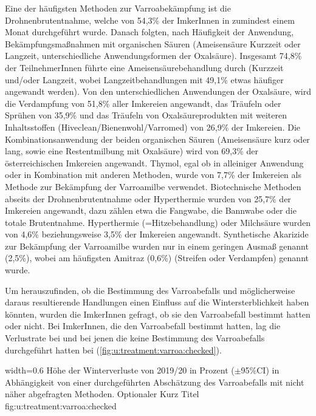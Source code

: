 Eine der häufigsten Methoden zur Varroabekämpfung ist die Drohnenbrutentnahme, welche von 54,3\% der ImkerInnen in zumindest einem Monat durchgeführt wurde. Danach folgten, nach Häufigkeit der Anwendung, Bekämpfungsmaßnahmen mit organischen Säuren (Ameisensäure Kurzzeit oder Langzeit, unterschiedliche Anwendungsformen der Oxalsäure). Insgesamt 74,8\% der TeilnehmerInnen führte eine Ameisensäurebehandlung durch (Kurzzeit und/oder Langzeit, wobei Langzeitbehandlungen mit 49,1\% etwas häufiger angewandt werden). Von den unterschiedlichen Anwendungen der Oxalsäure, wird die Verdampfung von 51,8\% aller Imkereien angewandt, das Träufeln oder Sprühen von 35,9\% und das Träufeln von Oxalsäureprodukten mit weiteren Inhaltsstoffen (Hiveclean/Bienenwohl/Varromed) von 26,9\% der Imkereien. Die Kombinationsanwendung der beiden organischen Säuren (Ameisensäure kurz oder lang, sowie eine Restentmilbung mit Oxalsäure) wird von 69,3\% der österreichischen Imkereien angewandt. Thymol, egal ob in alleiniger Anwendung oder in Kombination mit anderen Methoden, wurde von 7,7\% der Imkereien als Methode zur Bekämpfung der Varroamilbe verwendet. Biotechnische Methoden abseits der Drohnenbrutentnahme oder Hyperthermie wurden von 25,7\% der Imkereien angewandt, dazu zählen etwa die Fangwabe, die Bannwabe oder die totale Brutentnahme. Hyperthermie (=Hitzebehandlung) oder Milchsäure wurden von 4,6\% beziehungsweise 3,5\% der Imkereien angewandt. Synthetische Akarizide zur Bekämpfung der Varroamilbe wurden nur in einem geringen Ausmaß genannt (2,5\%), wobei am häufigsten Amitraz (0,6\%) (Streifen oder Verdampfen) genannt wurde.






Um herauszufinden, ob die Bestimmung des Varroabefalls und möglicherweise daraus resultierende Handlungen einen Einfluss auf die Wintersterblichkeit haben könnten, wurden die ImkerInnen gefragt, ob sie den Varroabefall bestimmt hatten oder nicht. Bei ImkerInnen, die den Varroabefall bestimmt hatten, lag die Verlustrate bei  und bei jenen die keine Bestimmung des Varroabefalls durchgeführt hatten bei  (\cref{fig:u:treatment:varroa:checked}).

{width=0.6\textwidth} %
{Höhe der Winterverluste von 2019/20 in Prozent ($\pm$95\%CI) in Abhängigkeit von einer durchgeführten Abschätzung des Varroabefalls mit nicht näher abgefragten Methoden.} %
{Optionaler Kurz Titel} %
{fig:u:treatment:varroa:checked} %

